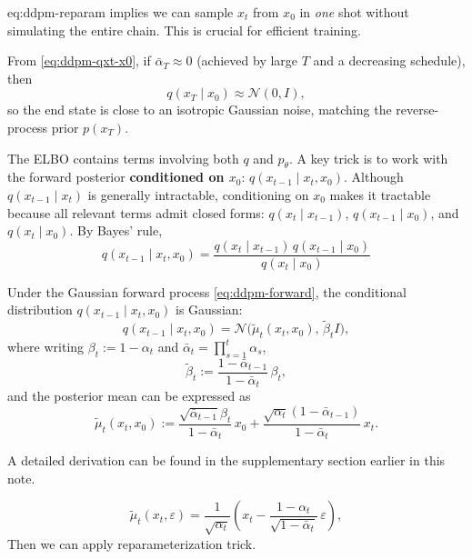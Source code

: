 \documentclass[../main]{subfiles}
\begin{document}
\begin{remark}
    {eq:ddpm-reparam} implies we can sample $x_t$ from $x_0$ in \emph{one} shot without simulating the entire chain.
This is crucial for efficient training.
\end{remark}

From \eqref{eq:ddpm-qxt-x0}, if $\bar\alpha_T\approx 0$ (achieved by large $T$ and a decreasing schedule),
then
\[
    q(x_T\mid x_0)\approx \mathcal N(0,I),
\]
so the end state is close to an isotropic Gaussian noise, matching the reverse-process prior $p(x_T)$.

The ELBO contains terms involving both $q$ and $p_\theta$.
A key trick is to work with the {forward posterior \textbf{conditioned on $x_0$}}: $q(x_{t-1}\mid x_t,x_0).$
Although $q(x_{t-1}\mid x_t)$ is generally intractable, conditioning on $x_0$ makes it tractable because
all relevant terms admit closed forms: $q(x_t\mid x_{t-1})$, $q(x_{t-1}\mid x_0)$, and $q(x_t\mid x_0)$.
By Bayes' rule,
\begin{equation}\label{eq:ddpm-bayes}
    q(x_{t-1}\mid x_t,x_0)
    =\frac{q(x_t\mid x_{t-1})\,q(x_{t-1}\mid x_0)}{q(x_t\mid x_0)}
\end{equation}

\begin{theorem}\label{thm:ddpm-posterior}
Under the Gaussian forward process \eqref{eq:ddpm-forward}, the conditional distribution
\(
    q(x_{t-1}\mid x_t,x_0)
\)
is Gaussian:
\begin{equation}
    q(x_{t-1}\mid x_t,x_0)
    = \mathcal N\!\bigl(\tilde\mu_t(x_t,x_0),\,\tilde\beta_t I\bigr),
\end{equation}
where writing $\beta_t:=1-\alpha_t$ and $\bar\alpha_t=\prod_{s=1}^t\alpha_s$,
\begin{equation}\label{eq:ddpm-posterior-var}
    \tilde\beta_t
    := \frac{1-\bar\alpha_{t-1}}{1-\bar\alpha_t}\,\beta_t,
\end{equation}
and the posterior mean can be expressed as
\begin{equation}\label{eq:ddpm-posterior-mean-x0}
    \tilde\mu_t(x_t,x_0)
    :=
    \frac{\sqrt{\bar\alpha_{t-1}}\beta_t}{1-\bar\alpha_t}\,x_0
    + \frac{\sqrt{\alpha_t}(1-\bar\alpha_{t-1})}{1-\bar\alpha_t}\,x_t.
\end{equation}
\end{theorem}
A detailed derivation can be found in the supplementary section earlier in this note.

\begin{remark}
\begin{equation}\label{eq:ddpm-posterior-mean-eps}
    \tilde\mu_t(x_t,\varepsilon)
    =
    \frac{1}{\sqrt{\alpha_t}}
    \left(
        x_t - \frac{1-\alpha_t}{\sqrt{1-\bar\alpha_t}}\,\varepsilon
    \right),
\end{equation}
Then we can apply reparameterization trick.
\end{remark}
\end{document}
